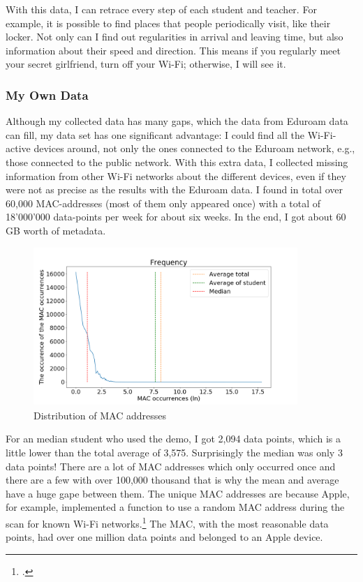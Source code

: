 \documentclass[paper=a4, fontsize=11pt]{article}
\begin{document}
With this data, I can retrace every step of each student and teacher. For example, it is possible to find places that people periodically visit, like their locker. Not only can I find out regularities in arrival and leaving time, but also information about their speed and direction. This means if you regularly meet your secret girlfriend, turn off your Wi-Fi; otherwise, I will see it.



\subsubsection{My Own Data}

Although my collected data has many gaps, which the data from Eduroam data can fill, my data set has one significant advantage: I could find all the Wi-Fi-active devices around, not only the ones connected to the Eduroam network, e.g., those connected to the public network. With this extra data,  I collected missing information from other Wi-Fi networks about the different devices, even if they were not as precise as the results with the Eduroam data. I found in total over 60,000 MAC-addresses (most of them only appeared once) with a total of 18'000'000 data-points per week for about six weeks. In the end, I got about 60 GB worth of metadata.

\begin{figure}
\centering
\includegraphics [width = 10cm, height = 6cm]{images/maccounter4.png}
\caption{Distribution of MAC addresses \label{usernames}}
\end{figure}

For an median student who used the demo, I got 2,094 data points, which is a little lower than the total average of 3,575. Surprisingly the median was only 3 data points! There are a lot of MAC addresses which only occurred once and there are a few with over 100,000 thousand  that is why the mean and average have a huge gape between them. The unique MAC addresses are because Apple, for example, implemented a function to use a random MAC address during the scan for known Wi-Fi networks.\footcite{applerandom}
The MAC, with the most reasonable data points, had over one million data points and belonged to an Apple device.
\end{document}

